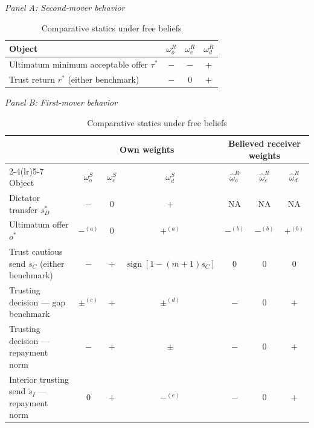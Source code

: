 \documentclass[11pt]{article}
\theoremstyle{plain}
\theoremstyle{remark}
\newcommand{\sgn}{\operatorname{sign}}
\begin{document}
\begin{table}[ht]
\centering
\small
\renewcommand{\arraystretch}{1.25}
\caption{Comparative statics under free beliefs}
\label{tab:first_mover_point}

\vspace{2pt}
\emph{Panel A: Second-mover behavior}\\[3pt]
\begin{tabular}{l ccc}
\toprule
Object & $\omega_o^R$ & $\omega_e^R$ & $\omega_d^R$ \\
\midrule
Ultimatum minimum acceptable offer $\tau^\ast$ & $-$ & $-$ & $+$ \\
Trust return $r^\ast$ (either benchmark) & $-$ & $0$ & $+$ \\
\bottomrule
\end{tabular}

\vspace{10pt}
\emph{Panel B: First-mover behavior}\\[3pt]
{\setlength{\tabcolsep}{4.5pt}%
\begin{tabular}{l ccc ccc}
\toprule
& \multicolumn{3}{c}{Own weights} &
\multicolumn{3}{c}{Believed receiver weights} \\
\cmidrule(lr){2-4}\cmidrule(lr){5-7}
Object
& $\omega_o^S$ & $\omega_e^S$ & $\omega_d^S$
& $\hat\omega_o^R$ & $\hat\omega_e^R$ & $\hat\omega_d^R$ \\
\midrule
Dictator transfer $s_D^\ast$
& $-$ & $0$ & $+$ & NA & NA & NA \\
Ultimatum offer $o^\ast$
& $-^{(a)}$ & $0$ & $+^{(a)}$ & $-^{(b)}$ & $-^{(b)}$ & $+^{(b)}$ \\
Trust cautious send $s_C$ (either benchmark)
& $-$ & $+$ & $\sgn[1-(m+1)s_C]$ & $0$ & $0$ & $0$ \\
Trusting decision --- gap benchmark
& $\pm^{(c)}$ & $+$ & $\pm^{(d)}$ & $-$ & $0$ & $+$ \\
Trusting decision --- repayment norm
& $-$ & $+$ & $\pm$ & $-$ & $0$ & $+$ \\
Interior trusting send $\tilde s_I$ --- repayment norm
& $0$ & $+$ & $-^{(e)}$ & $-$ & $0$ & $+$ \\
\bottomrule
\end{tabular}}


\end{table}
\end{document}
